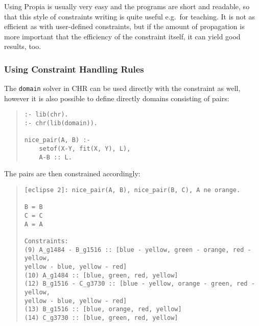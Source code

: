 Using Propia is usually very easy and the programs are short
and readable, so that this style of constraints writing
is quite useful e.g.\ for teaching.
It is not as efficient as with user-defined constraints, but
if the amount of propagation is more important that the efficiency
of the constraint itself, it can yield good results, too.

\subsubsection{Using Constraint Handling Rules}
The {\tt domain} solver in {\sf CHR} can be used directly with the
 constraint as well, however it is also possible
to define directly domains consisting of pairs:
\begin{quote}
\begin{verbatim}
:- lib(chr).
:- chr(lib(domain)).

nice_pair(A, B) :-
    setof(X-Y, fit(X, Y), L),
    A-B :: L.

\end{verbatim}
\end{quote}

The pairs are then constrained accordingly:
\begin{quote}
\begin{verbatim}
[eclipse 2]: nice_pair(A, B), nice_pair(B, C), A ne orange.

B = B
C = C
A = A

Constraints:
(9) A_g1484 - B_g1516 :: [blue - yellow, green - orange, red - yellow,
yellow - blue, yellow - red]
(10) A_g1484 :: [blue, green, red, yellow]
(12) B_g1516 - C_g3730 :: [blue - yellow, orange - green, red - yellow,
yellow - blue, yellow - red]
(13) B_g1516 :: [blue, orange, red, yellow]
(14) C_g3730 :: [blue, green, red, yellow]
\end{verbatim}
\end{quote}


